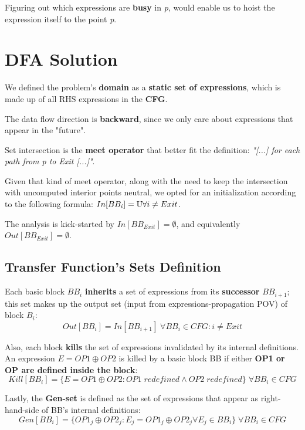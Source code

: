 \documentclass[a4paper,12pt,numbers=noenddot]{scrreprt}
\begin{document}
        Figuring out which expressions are \textbf{busy} in \textit{p}, would enable us to hoist the expression itself to the point \textit{p}.

    \section*{DFA Solution}
    
        We defined the problem's \textbf{domain} as a \textbf{static set of expressions}, which is made up of all RHS expressions in the \textbf{CFG}.
    
        The data flow direction is \textbf{backward}, since we only care about expressions that appear in the "future".
    
        Set intersection is the \textbf{meet operator} that better fit the definition: \textit{"[...] for each path from p to Exit [...]"}.
    
        Given that kind of meet operator, along with the need to keep the intersection with uncomputed interior points neutral, we opted for an initialization according to the following formula: $In[BB_i] = \mathbb{U} \space \forall i \neq Exit$.
    
        The analysis is kick-started by $In[BB_{Exit}] = \emptyset$, and equivalently $Out[BB_{Exit}] = \emptyset$.

    \subsection*{Transfer Function's Sets Definition}
    
        Each basic block $BB_i$ \textbf{inherits} a set of expressions from its \textbf{successor} $BB_{i+1}$; this set makes up the output set (input from expressions-propagation POV) of block $B_i$: $$Out[BB_i] = In[BB_{i+1}] \; \forall BB_i \in CFG : i \neq Exit$$
        
        Also, each block \textbf{kills} the set of expressions invalidated by its internal definitions. An expression $E = OP1 \oplus OP2$ is killed by a basic block BB if either \textbf{OP1 or OP are defined inside the block}: 
        $$Kill[BB_i] = \{ E = OP1 \oplus OP2 : OP1 \; redefined \wedge OP2 \; redefined \} \; \forall BB_i \in CFG$$

        Lastly, the \textbf{Gen-set} is defined as the set of expressions that appear as right-hand-side of BB's internal definitions: 
        $$Gen[BB_i] = \{ OP1_j \oplus OP2_j : E_j = OP1_j \oplus OP2_j \forall E_j \in BB_i\} \; \forall BB_i \in CFG$$
\end{document}
